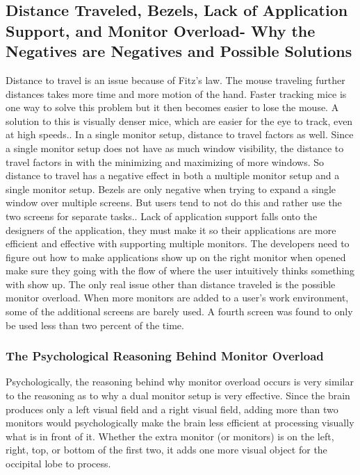 \documentclass[a4paper]{article}
\begin{document}
\subsection{Distance Traveled, Bezels, Lack of Application Support, and Monitor Overload- Why the Negatives are Negatives and Possible Solutions}
Distance to travel is an issue because of Fitz's law. The mouse traveling further distances takes more time and more motion of the hand. Faster tracking mice is one way to solve this problem but it then becomes easier to lose the mouse. A solution to this is visually denser mice, which are easier for the eye to track, even at high speeds.\cite{Truemper}. In a single monitor setup, distance to travel factors as well. Since a single monitor setup does not have as much window visibility, the distance to travel factors in with the minimizing and maximizing of more windows. So distance to travel has a negative effect in both a multiple monitor setup and a single monitor setup. Bezels are only negative when trying to expand a single window over multiple screens. But users tend to not do this and rather use the two screens for separate tasks.\cite{Grudin}. Lack of application support falls onto the designers of the application, they must make it so their applications are more efficient and effective with supporting multiple monitors. The developers need to figure out how to make applications show up on the right monitor when opened make sure they going with the flow of where the user intuitively thinks something with show up.\cite{Grudin} The only real issue other than distance traveled is the possible monitor overload. When more monitors are added to a user's work environment, some of the additional screens are barely used. A fourth screen was found to only be used less than two percent of the time.\cite{Truemper}
\subsubsection{The Psychological Reasoning Behind Monitor Overload}
Psychologically, the reasoning behind why monitor overload occurs is very similar to the reasoning as to why a dual monitor setup is very effective. Since the brain produces only a left visual field and a right visual field, adding more than two monitors would psychologically make the brain less efficient at processing visually what is in front of it. Whether the extra monitor (or monitors) is on the left, right, top, or bottom of the first two, it adds one more visual object for the occipital lobe to process.
\end{document}
